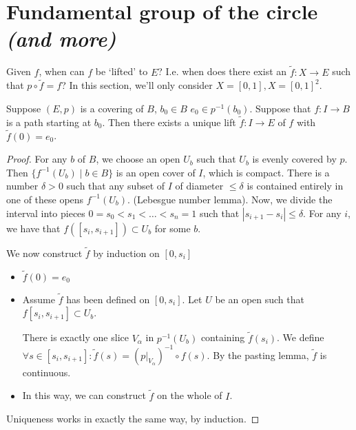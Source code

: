 \section{Fundamental group of the circle \emph{(and more)}}

Given $f$, when can $f$ be `lifted' to $E$?
I.e. when does there exist an $\tilde f : X \to  E$ such that $p \circ \tilde f = f$?
In this section, we'll only consider $X = [0, 1], X = [0, 1]^2$.

\begin{center}
\end{center}


\begin{lemma}
    Suppose $(E, p)$ is a covering of $B$, $b_0 \in B$ $e_0 \in p ^{-1}(b_0)$.
    Suppose that $f: I \to B$ is a path starting at $b_0$.
    Then there exists a unique lift $\tilde f: I \to  E$ of $f$ with $\tilde f(0) =e_0$.
\end{lemma}


\begin{proof}
    For any $b$ of $B$, we choose an open $U_b$ such that $U_b$ is evenly covered by $p$.
    Then $\{ f^{-1}(U_b)  \mid  b \in B\}$ is an open cover of $I$, which is compact.
    There is a number $\delta > 0$ such that any subset of $I$ of diameter $\le  \delta$ is contained entirely in one of these opens $f^{-1}(U_b)$. (Lebesgue number lemma).
    Now, we divide the interval into pieces $0 = s_0 < s_1 < \ldots < s_n = 1$ such that $|s_{i+1} - s_i| \le \delta$.
    For any $i$, we have that $f([s_i, s_{i+1}]) \subset U_b$ for some $b$.

    \begin{figure}[H]
        \centering
        \label{fig:fundamental-group-of-circle-lemma}
    \end{figure}

    We now construct $\tilde f$ by induction on $[0, s_i]$
    \begin{itemize}
        \item $\tilde f (0) = e_0$ 
        \item Assume $\tilde f$ has been defined on  $[0, s_i]$.
            Let  $U$ be an open such that $f[s_i, s_{i+1}] \subset U_b$.

            There is exactly one slice $V_\alpha$ in $p^{-1}(U_b)$ containing $\tilde f(s_i)$.
            We define  $\forall  s \in [s_i, s_{i+1}]: \tilde f(s) = (p|_{V_\alpha})^{-1} \circ f(s)$.
            By the pasting lemma, $\tilde f$ is continuous.
        \item In this way, we can construct $\tilde f$ on the whole of  $I$.
    \end{itemize}

    Uniqueness works in exactly the same way, by induction.
\end{proof}


